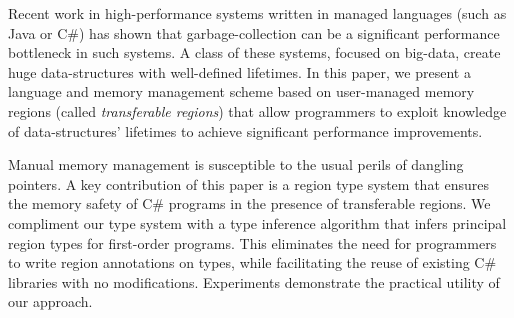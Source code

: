 Recent work in high-performance systems written in managed languages
(such as Java or C\#) has shown that garbage-collection can be a
significant performance bottleneck in such systems.  A class of these
systems, focused on big-data, create huge data-structures with
well-defined lifetimes.  In this paper, we present a language and
memory management scheme based on user-managed memory regions (called
\emph{transferable regions}) that allow programmers to exploit
knowledge of data-structures' lifetimes to achieve significant
performance improvements.

Manual memory management is susceptible to the usual perils of
dangling pointers.  A key contribution of this paper is a region type
system that ensures the memory safety of C\# programs in the presence
of transferable regions. We compliment our type system with a type
inference algorithm that infers principal region types for first-order
programs. This eliminates the need for programmers to write region
annotations on types, while facilitating the reuse of existing C\#
libraries with no modifications. Experiments demonstrate the
practical utility of our approach.

